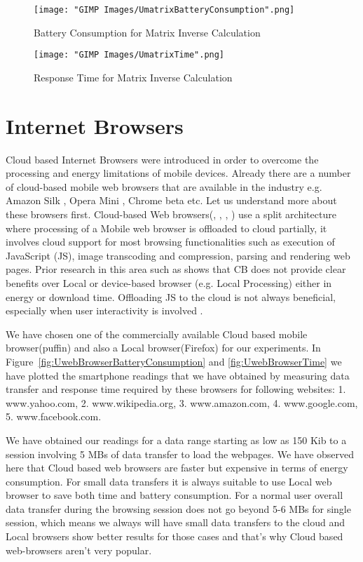 \documentclass{report}
\begin{document}
\begin{figure}[h]
  \centering
  \texttt{[image: "GIMP Images/UmatrixBatteryConsumption".png]}
  \caption{Battery Consumption for Matrix Inverse Calculation}
  \label{fig:UmatrixBatteryConsumption}
\end{figure}

\begin{figure}[h]
  \centering
  \texttt{[image: "GIMP Images/UmatrixTime".png]}
  \caption{Response Time for Matrix Inverse Calculation}
  \label{fig:UmatrixTime}
\end{figure}

\section{Internet Browsers}
Cloud based Internet Browsers were introduced in order to overcome the processing and energy limitations
of mobile devices. Already there are a number of cloud-based mobile web browsers that are available in the industry e.g. Amazon Silk \cite{AmazonSilk}, Opera Mini \cite{OperaMini}, Chrome beta \cite{ChromeBeta} etc. Let us understand more about these browsers first.
Cloud-based Web browsers(\cite{AmazonSilk}, \cite{ChromeBeta}, \cite{OperaMini}, \cite{wang2013accelerating}) use a split architecture where processing of a Mobile web
browser is offloaded to cloud partially, it involves cloud support for most browsing functionalities such as execution of JavaScript (JS), image transcoding and compression, parsing and rendering web pages.
Prior research in this area such as \cite{sivakumar2014cloud} shows that CB does not provide clear benefits over Local or device-based browser (e.g. Local Processing) either in energy or download time. Offloading JS to the cloud is not always beneficial, especially when user interactivity is involved \cite{sivakumar2014cloud}. 

We have chosen one of the commercially available Cloud based mobile browser(puffin) and also a Local browser(Firefox) for our experiments. In Figure~\ref{fig:UwebBrowserBatteryConsumption} and \ref{fig:UwebBrowserTime} we have plotted the smartphone readings that we have obtained by measuring data transfer and response time required by these browsers for following websites: 1. www.yahoo.com, 2. www.wikipedia.org, 3. www.amazon.com, 4. www.google.com, 5. www.facebook.com.

We have obtained our readings for a data range starting as low as 150 Kib to a session involving 5 MBs of data transfer to load the webpages. We have observed here that Cloud based web browsers are faster but expensive in terms of energy consumption. For small data transfers it is always suitable to use Local web browser to save both time and battery consumption. For a normal user overall data transfer during the browsing session does not go beyond 5-6 MBs for single session, which means we always will have small data transfers to the cloud and Local browsers show better results for those cases and that's why Cloud based web-browsers aren't very popular.
\end{document}
